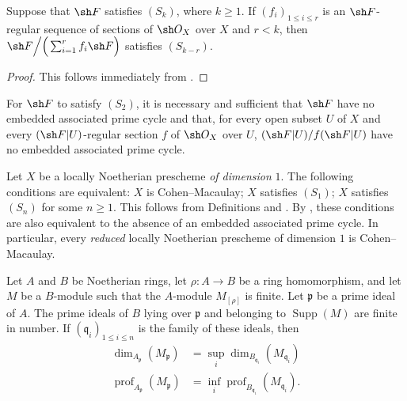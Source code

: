 \begin{corollary}[5.7.6]
\label{IV.5.7.6}
Suppose that $\sh F$ satisfies $(S_k)$, where $k\geq1$.  If
$(f_i)_{1\leq i\leq r}$ is an $\sh F$-regular sequence of sections
of $\sh O_X$ over $X$ and $r<k$, then $\sh F\Big/\Big(\sum_{i=1}^{r}f_i\sh F\Big)$
satisfies $(S_{k-r})$.
\end{corollary}

\begin{proof}
This follows immediately from .
\end{proof}

\begin{corollary}[5.7.7]
\label{IV.5.7.7}
For $\sh F$ to satisfy $(S_2)$, it is necessary and sufficient that
$\sh F$ have no embedded associated prime cycle and that, for every open
subset $U$ of $X$ and every $(\sh F|U)$-regular section $f$ of $\sh O_X$
over $U$, $(\sh F|U)/f(\sh F|U)$ have no embedded associated prime
cycle.
\end{corollary}


\begin{remarks}[5.7.8]
\label{IV.5.7.8}
Let $X$ be a locally Noetherian prescheme \emph{of dimension} $1$.  The
following conditions are equivalent: $X$ is Cohen--Macaulay; $X$
satisfies $(S_1)$; $X$ satisfies $(S_n)$ for some $n\geq1$.  This
follows from Definitions  and .
By , these conditions are also equivalent to the
absence of an embedded associated prime cycle.  In particular,
every \emph{reduced} locally Noetherian prescheme of dimension $1$ is
Cohen--Macaulay.
\end{remarks}

\begin{proposition}[5.7.9]
\label{IV.5.7.9}
Let $A$ and $B$ be Noetherian rings, let $\rho:A\to B$ be a ring
homomorphism, and let $M$ be a $B$-module such that the
$A$-module $M_{[\rho]}$ is finite.  Let $\mathfrak p$ be a prime
ideal of $A$.  The prime ideals of $B$ lying over $\mathfrak p$ and
belonging to $\operatorname{Supp}(M)$ are finite in number.  If
$(\mathfrak q_i)_{1\leq i\leq n}$ is the family of these ideals,
then
\begin{align}
\dim_{A_{\mathfrak p}}(M_{\mathfrak p})
 &=\sup_i\dim_{B_{\mathfrak q_i}}(M_{\mathfrak q_i})
\tag{5.7.9.1}\label{IV.5.7.9.1}\\
\operatorname{prof}_{A_{\mathfrak p}}(M_{\mathfrak p})
 &=\inf_i\operatorname{prof}_{B_{\mathfrak q_i}}
   (M_{\mathfrak q_i}).
\tag{5.7.9.2}\label{IV.5.7.9.2}
\end{align}
\end{proposition}

